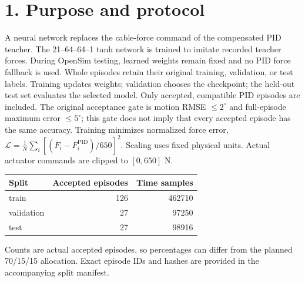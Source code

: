 \section*{1. Purpose and protocol}
A neural network replaces the cable-force command of the compensated PID teacher. The 21--64--64--1 tanh network is trained to imitate recorded teacher forces. During OpenSim testing, learned weights remain fixed and no PID force fallback is used.
Whole episodes retain their original training, validation, or test labels. Training updates weights; validation chooses the checkpoint; the held-out test set evaluates the selected model. Only accepted, compatible PID episodes are included. The original acceptance gate is motion RMSE $\leq2^\circ$ and full-episode maximum error $\leq5^\circ$; this gate does not imply that every accepted episode has the same accuracy.
Training minimizes normalized force error, $\mathcal{L}=\frac{1}{N}\sum_i[(\hat F_i-F_i^{\mathrm{PID}})/650]^2$. Scaling uses fixed physical units. Actual actuator commands are clipped to $[0,650]$ N.
\begin{center}\begin{tabular}{lrr}\toprule Split & Accepted episodes & Time samples\\\midrule
train & 126 & 462710\\
validation & 27 & 97250\\
test & 27 & 98916\\
\bottomrule\end{tabular}\end{center}
Counts are actual accepted episodes, so percentages can differ from the planned 70/15/15 allocation. Exact episode IDs and hashes are provided in the accompanying split manifest.
